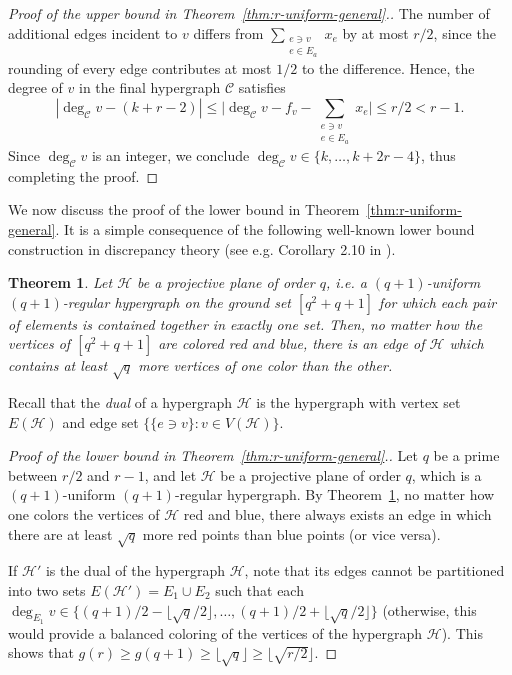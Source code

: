 \documentclass[11pt, a4paper]{article}
\newtheorem{theorem}{Theorem}
\numberwithin{theorem}{section} %
\theoremstyle{remark}
\theoremstyle{definition}
\def\cC{\mathcal{C}}
\def\cH{\mathcal{H}}
\begin{document}
\begin{proof}[Proof of the upper bound in Theorem~\ref{thm:r-uniform-general}.]
The number of additional edges incident to $v$ differs from $\sum_{\substack{e\ni v\\e\in E_a}}x_e$ by at most $r/2$, since the rounding of every edge contributes at most $1/2$ to the difference. Hence, the degree of $v$ in the final hypergraph $\cC$ satisfies
\[|\deg_\cC v-(k+r-2)|\leq \Big|\deg_\cC v-f_v-\sum_{\substack{e\ni v\\e\in E_a}}x_e\Big|\leq r/2< r-1.\]
Since $\deg_\cC v$ is an integer, we conclude $\deg_{\cC} v \in \{k, \dots, k+2r-4\}$, thus completing the proof.
\end{proof}

We now discuss the proof of the lower bound in Theorem~\ref{thm:r-uniform-general}. It is a simple consequence of the following well-known lower bound construction in discrepancy theory (see e.g. Corollary 2.10 in \cite{BeckSos95}). 

\begin{theorem}\label{thm:discrepancy-lower-bound}
Let $\cH$ be a projective plane of order $q$, i.e. a $(q+1)$-uniform $(q+1)$-regular hypergraph on the ground set $[q^2+q+1]$ for which each pair of elements is contained together in exactly one set. Then, no matter how the vertices of $[q^2+q+1]$ are colored red and blue, there is an edge of $\cH$ which contains at least $\sqrt{q}$ more vertices of one color than the other. 
\end{theorem}

Recall that the \textit{dual} of a hypergraph $\cH$ is the hypergraph with vertex set $E(\cH)$ and edge set $\{\{e\ni v\}: v\in V(\cH)\}$. 

\begin{proof}[Proof of the lower bound in Theorem~\ref{thm:r-uniform-general}.]
Let $q$ be a prime between $r/2$ and $r-1$, and let $\cH$ be a projective plane of order $q$, which is a $(q+1)$-uniform $(q+1)$-regular hypergraph. By Theorem~\ref{thm:discrepancy-lower-bound}, no matter how one colors the vertices of $\cH$ red and blue, there always exists an edge in which there are at least $\sqrt{q}$ more red points than blue points (or vice versa). 

If $\cH'$ is the dual of the hypergraph $\cH$, note that its edges cannot be partitioned into two sets $E(\cH')=E_1\cup E_2$ such that each $\deg_{E_1} v\in \{(q+1)/2-\lfloor \sqrt{q}/2\rfloor, \dots, (q+1)/2+\lfloor \sqrt{q}/2\rfloor\}$ (otherwise, this would provide a balanced coloring of the vertices of the hypergraph $\cH$). This shows that $g(r)\geq g(q+1)\geq \lfloor \sqrt{q}\rfloor \geq \lfloor \sqrt{r/2}\rfloor$. 
\end{proof}
\end{document}
